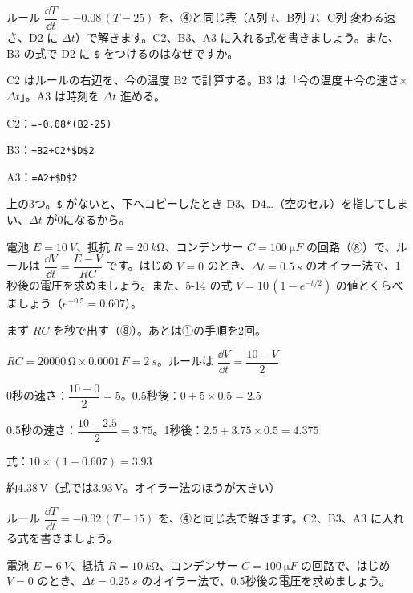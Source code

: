 \begin{reidai}[表計算の式を書く]
ルール $\dfrac{\dd T}{\dd t}=-0.08\,(T-25)$ を、④と同じ表（A列 $t$、B列 $T$、C列 変わる速さ、D2 に $\Delta t$）で解きます。C2、B3、A3 に入れる式を書きましょう。また、B3 の式で D2 に \texttt{\$} をつけるのはなぜですか。\par
\kangaekata C2 はルールの右辺を、今の温度 B2 で計算する。B3 は「今の温度＋今の速さ×$\Delta t$」。A3 は時刻を $\Delta t$ 進める。\par
\shiki C2：\texttt{=-0.08*(B2-25)}\par
\bkvicl B3：\texttt{=B2+C2*\$D\$2}\par
\bkvicl A3：\texttt{=A2+\$D\$2}\par
\kotae 上の3つ。\texttt{\$} がないと、下へコピーしたとき D3、D4…（空のセル）を指してしまい、$\Delta t$ が0になるから。
\end{reidai}

\begin{reidai}[コンデンサーの充電]
電池 $E=\qty{10}{V}$、抵抗 $R=\qty{20}{k\ohm}$、コンデンサー $C=\qty{100}{\micro F}$ の回路（⑧）で、ルールは $\dfrac{\dd V}{\dd t}=\dfrac{E-V}{RC}$ です。はじめ $V=0$ のとき、$\Delta t=\qty{0.5}{s}$ のオイラー法で、1秒後の電圧を求めましょう。また、5-14 の式 $V=10\,(1-e^{-t/2})$ の値とくらべましょう（$e^{-0.5}=0.607$）。\par
\kangaekata まず $RC$ を秒で出す（⑧）。あとは①の手順を2回。\par
\shiki $RC=\num{20000}\,\unit{\ohm}\times0.0001\,\unit{F}=\qty{2}{s}$。ルールは $\dfrac{\dd V}{\dd t}=\dfrac{10-V}{2}$\par
\bkvicl 0秒の速さ：$\dfrac{10-0}{2}=5$。0.5秒後：$0+5\times0.5=2.5$\par
\bkvicl 0.5秒の速さ：$\dfrac{10-2.5}{2}=3.75$。1秒後：$2.5+3.75\times0.5=4.375$\par
\bkvicl 式：$10\times(1-0.607)=3.93$\par
\kotae 約4.38\,V（式では3.93\,V。オイラー法のほうが大きい）
\end{reidai}

\begingroup{}%
\noindent\begin{minipage}[t]{0.49\linewidth}
\begin{jibun}
\raggedright ルール $\dfrac{\dd T}{\dd t}=-0.02\,(T-15)$ を、④と同じ表で解きます。C2、B3、A3 に入れる式を書きましょう。
\end{jibun}
\end{minipage}\hfill
\begin{minipage}[t]{0.49\linewidth}
\begin{jibun}
\raggedright 電池 $E=\qty{6}{V}$、抵抗 $R=\qty{10}{k\ohm}$、コンデンサー $C=\qty{100}{\micro F}$ の回路で、はじめ $V=0$ のとき、$\Delta t=\qty{0.25}{s}$ のオイラー法で、0.5秒後の電圧を求めましょう。
\end{jibun}
\end{minipage}\par
\endgroup

